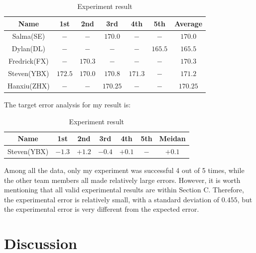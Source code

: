 \documentclass{article}
\begin{document}
    \begin{table}[H]
    \scriptsize
        \caption {Experiment result} \label{tb:e_result} 
        \begin{center}
            \begin{tabular}{ccccccc}
                \hline
                Name & 1st & 2nd & 3rd & 4th & 5th & Average \\
                \hline
                Salma(SE)       &$-$        &$-$        &$170.0$    &$-$        &$-$        &$170.0$        \\
                Dylan(DL)       &$-$        &$-$        &$-$        &$-$        &$165.5$    &$165.5$        \\
                Fredrick(FX)    &$-$        &$170.3$    &$-$        &$-$        &$-$        &$170.3$        \\
                Steven(YBX)     &$172.5$    &$170.0$    &$170.8$    &$171.3$    &$-$        &$171.2$        \\
                Hanxiu(ZHX)     &$-$        &$-$        &$170.25$   &$-$        &$-$        &$170.25$       \\
                \hline
            \end{tabular}
        \end{center}
    \end{table}
    The target error analysis for my result is:
    \begin{table}[H]
        \caption {Experiment result} \label{tb:e_result} 
        \begin{center}
            \begin{tabular}{ccccccc}
                \hline
                Name & 1st & 2nd & 3rd & 4th & 5th & Meidan \\
                \hline
                Steven(YBX) & $-1.3$   & $+1.2$  & $-0.4$   & $+0.1$ & $-$     & $+0.1$         \\
                \hline
            \end{tabular}
        \end{center}
    \end{table}
    Among all the data, only my experiment was successful 4 out of 5 times, while the other team members all made relatively large errors. However, it is worth mentioning that all valid experimental results are within Section C. Therefore, the experimental error is relatively small, with a standard deviation of $0.455$, but the experimental error is very different from the expected error.
\section{Discussion}
\end{document}
